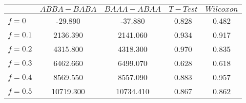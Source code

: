 \begin{tabular}{lcccc}
\toprule
 & $ABBA-BABA$ & $BAAA-ABAA$ & $T-Test$ & $Wilcoxon$ \\
\midrule
$f = 0$ & -29.890 & -37.880 & 0.828 & 0.482 \\
$f = 0.1$ & 2136.390 & 2141.060 & 0.934 & 0.917 \\
$f = 0.2$ & 4315.800 & 4318.300 & 0.970 & 0.835 \\
$f = 0.3$ & 6462.660 & 6499.070 & 0.628 & 0.618 \\
$f = 0.4$ & 8569.550 & 8557.090 & 0.883 & 0.957 \\
$f = 0.5$ & 10719.300 & 10734.410 & 0.867 & 0.862 \\
\bottomrule
\end{tabular}

